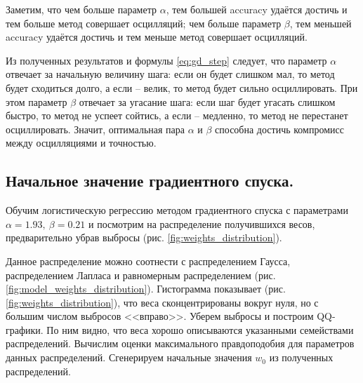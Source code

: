 \documentclass[12pt]{extarticle}
\begin{document}
Заметим, что чем больше параметр $\alpha$, тем большей accuracy удаётся достичь и тем больше метод совершает осцилляций; чем больше параметр $\beta$, тем меньшей accuracy удаётся достичь и тем меньше метод совершает осцилляций.

Из полученных результатов и формулы \eqref{eq:gd_step} следует, что параметр $\alpha$ отвечает за начальную величину шага: если он будет слишком мал, то метод будет сходиться долго, а если -- велик, то метод будет сильно осциллировать. При этом параметр $\beta$ отвечает за угасание шага: если шаг будет угасать слишком быстро, то метод не успеет сойтись, а если -- медленно, то метод не перестанет осциллировать. Значит, оптимальная пара $\alpha$ и $\beta$ способна достичь компромисс между осцилляциями и точностью.

\subsection{Начальное значение градиентного спуска.}\label{sec:w0}

Обучим логистическую регрессию методом градиентного спуска с параметрами $\alpha=1.93,\ \beta=0.21$ и посмотрим на распределение получившихся весов, предварительно убрав выбросы (рис. \ref{fig:weights_distribution}).

Данное распределение можно соотнести с распределением Гаусса, распределением Лапласа и равномерным распределением (рис. \ref{fig:model_weights_distribution}). Гистограмма показывает (рис. \ref{fig:weights_distribution}), что веса сконцентрированы вокруг нуля, но с большим числом выбросов <<вправо>>. Уберем выбросы и построим QQ-графики. По ним видно, что веса хорошо описываются указанными семействами распределений. Вычислим оценки максимального правдоподобия для параметров данных распределений. Сгенерируем начальные значения $w_0$ из полученных распределений.
\end{document}
